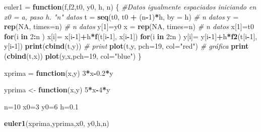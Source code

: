 \documentclass[]{article}
\newenvironment{Shaded}{\begin{snugshade}}{\end{snugshade}}
\newcommand{\KeywordTok}[1]{\textcolor[rgb]{0.13,0.29,0.53}{\textbf{#1}}}
\newcommand{\DataTypeTok}[1]{\textcolor[rgb]{0.13,0.29,0.53}{#1}}
\newcommand{\DecValTok}[1]{\textcolor[rgb]{0.00,0.00,0.81}{#1}}
\newcommand{\FloatTok}[1]{\textcolor[rgb]{0.00,0.00,0.81}{#1}}
\newcommand{\StringTok}[1]{\textcolor[rgb]{0.31,0.60,0.02}{#1}}
\newcommand{\CommentTok}[1]{\textcolor[rgb]{0.56,0.35,0.01}{\textit{#1}}}
\newcommand{\OtherTok}[1]{\textcolor[rgb]{0.56,0.35,0.01}{#1}}
\newcommand{\ControlFlowTok}[1]{\textcolor[rgb]{0.13,0.29,0.53}{\textbf{#1}}}
\newcommand{\OperatorTok}[1]{\textcolor[rgb]{0.81,0.36,0.00}{\textbf{#1}}}
\newcommand{\NormalTok}[1]{#1}
\begin{document}
\begin{Shaded}
\begin{Highlighting}[]
\NormalTok{euler1 =}\StringTok{ }\ControlFlowTok{function}\NormalTok{(f,f2,t0, y0, h, n) \{}
\CommentTok{#Datos igualmente espaciados iniciando en x0 = a, paso h. "n" datos }
\NormalTok{  t =}\StringTok{ }\KeywordTok{seq}\NormalTok{(t0, t0 }\OperatorTok{+}\StringTok{ }\NormalTok{(n}\OperatorTok{-}\DecValTok{1}\NormalTok{)}\OperatorTok{*}\NormalTok{h, }\DataTypeTok{by =}\NormalTok{ h) }\CommentTok{# n datos}
\NormalTok{y =}\StringTok{ }\KeywordTok{rep}\NormalTok{(}\OtherTok{NA}\NormalTok{, }\DataTypeTok{times=}\NormalTok{n) }\CommentTok{# n datos}
\NormalTok{y[}\DecValTok{1}\NormalTok{]=y0}
\NormalTok{x =}\StringTok{ }\KeywordTok{rep}\NormalTok{(}\OtherTok{NA}\NormalTok{, }\DataTypeTok{times=}\NormalTok{n) }\CommentTok{# n datos}
\NormalTok{x[}\DecValTok{1}\NormalTok{]=t0}
\ControlFlowTok{for}\NormalTok{(i }\ControlFlowTok{in} \DecValTok{2}\OperatorTok{:}\NormalTok{n ) x[i]=}\StringTok{ }\NormalTok{x[i}\OperatorTok{-}\DecValTok{1}\NormalTok{]}\OperatorTok{+}\NormalTok{h}\OperatorTok{*}\KeywordTok{f}\NormalTok{(t[i}\OperatorTok{-}\DecValTok{1}\NormalTok{], x[i}\OperatorTok{-}\DecValTok{1}\NormalTok{])}
\ControlFlowTok{for}\NormalTok{(i }\ControlFlowTok{in} \DecValTok{2}\OperatorTok{:}\NormalTok{n ) y[i]=}\StringTok{ }\NormalTok{y[i}\OperatorTok{-}\DecValTok{1}\NormalTok{]}\OperatorTok{+}\NormalTok{h}\OperatorTok{*}\KeywordTok{f2}\NormalTok{(t[i}\OperatorTok{-}\DecValTok{1}\NormalTok{], y[i}\OperatorTok{-}\DecValTok{1}\NormalTok{])}
\KeywordTok{print}\NormalTok{(}\KeywordTok{cbind}\NormalTok{(t,y)) }\CommentTok{# print}
\KeywordTok{plot}\NormalTok{(t,y, }\DataTypeTok{pch=}\DecValTok{19}\NormalTok{, }\DataTypeTok{col=}\StringTok{"red"}\NormalTok{) }\CommentTok{# gráfica}
\KeywordTok{print}\NormalTok{ (}\KeywordTok{cbind}\NormalTok{(t,x))}
\KeywordTok{plot}\NormalTok{(y,x,}\DataTypeTok{pch=}\DecValTok{19}\NormalTok{, }\DataTypeTok{col=}\StringTok{"blue"}\NormalTok{)}
\NormalTok{\}}

\NormalTok{xprima =}\StringTok{ }\ControlFlowTok{function}\NormalTok{(x,y) }\DecValTok{3}\OperatorTok{*}\NormalTok{x}\OperatorTok{-}\FloatTok{0.2}\OperatorTok{*}\NormalTok{y}

\NormalTok{yprima <-}\StringTok{ }\ControlFlowTok{function}\NormalTok{(x,y) }\DecValTok{5}\OperatorTok{*}\NormalTok{x}\OperatorTok{-}\DecValTok{4}\OperatorTok{*}\NormalTok{y}

\NormalTok{n=}\DecValTok{10}
\NormalTok{x0=}\DecValTok{3}
\NormalTok{y0=}\DecValTok{6}
\NormalTok{h=}\FloatTok{0.1}


\KeywordTok{euler1}\NormalTok{(xprima,yprima,x0, y0,h,n)}
\end{Highlighting}
\end{Shaded}
\end{document}
